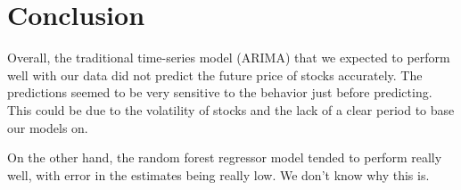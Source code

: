 \documentclass[12pt]{article}
\begin{document}
\section{Conclusion}
Overall, the traditional time-series model (ARIMA) that we expected to perform well with our data did not predict the future price of stocks accurately. The predictions seemed to be very sensitive to the behavior just before predicting. This could be due to the volatility of stocks and the lack of a clear period to base our models on.\par
On the other hand, the random forest regressor model tended to perform really well, with error in the estimates being really low. We don't know why this is.
\end{document}
